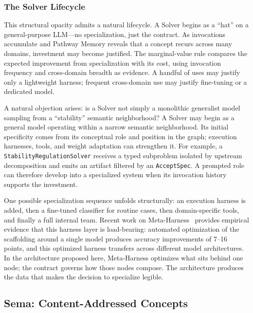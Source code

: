 \documentclass[11pt]{article}
\let\oldtexttt\texttt
\renewcommand{\texttt}[1]{\oldtexttt{\small #1}}
\begin{document}
\subsubsection{The Solver Lifecycle}

This structural opacity admits a natural lifecycle. A Solver begins as a ``hat'' on a general-purpose LLM---no specialization, just the contract. As invocations accumulate and Pathway Memory reveals that a concept recurs across many domains, investment may become justified. The marginal-value rule compares the expected improvement from specialization with its cost, using invocation frequency and cross-domain breadth as evidence. A handful of uses may justify only a lightweight harness; frequent cross-domain use may justify fine-tuning or a dedicated model.

A natural objection arises: is a Solver not simply a monolithic generalist model sampling from a ``stability'' semantic neighborhood? A Solver may begin as a general model operating within a narrow semantic neighborhood. Its initial specificity comes from its conceptual role and position in the graph; execution harnesses, tools, and weight adaptation can strengthen it. For example, a \texttt{StabilityRegulationSolver} receives a typed subproblem isolated by upstream decomposition and emits an artifact filtered by an \texttt{AcceptSpec}. A prompted role can therefore develop into a specialized system when its invocation history supports the investment.

One possible specialization sequence unfolds structurally: an execution harness is added, then a fine-tuned classifier for routine cases, then domain-specific tools, and finally a full internal team. Recent work on Meta-Harness~\cite{lee2026metaharness} provides empirical evidence that this harness layer is load-bearing: automated optimization of the scaffolding around a single model produces accuracy improvements of 7--16 points, and this optimized harness transfers across different model architectures. In the architecture proposed here, Meta-Harness optimizes what sits behind one node; the contract governs how those nodes compose. The architecture produces the data that makes the decision to specialize legible.

\subsection{Sema: Content-Addressed Concepts}
\label{sec:sema}
\end{document}
